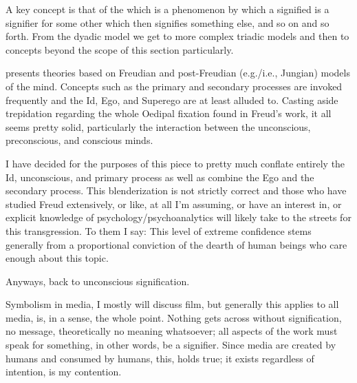 \documentclass[../butidigress.tex]{subfiles}
\begin{document}
A key concept is that of the  which is a phenomenon by which a signified is a signifier for some other  which then signifies something else, and so on and so forth.
From the dyadic model we get to more complex triadic models and then to concepts beyond the scope of this section particularly.


 presents theories based on Freudian and post-Freudian (e.g./i.e., Jungian) models of the mind.
Concepts such as the primary and secondary processes are invoked frequently and the Id, Ego, and Superego are at least alluded to.
Casting aside trepidation regarding the whole Oedipal fixation found in Freud's work, it all seems pretty solid, particularly the interaction between the unconscious, preconscious, and conscious minds.

I have decided for the purposes of this piece to pretty much conflate entirely the Id, unconscious, and primary process as well as combine the Ego and the secondary process.
This blenderization is not strictly correct and those who have studied Freud extensively, or like, at all I'm assuming, or have an interest in, or explicit knowledge of psychology/psychoanalytics will likely take to the streets for this transgression.
To them I say: 
This level of extreme confidence stems generally from a proportional conviction of the dearth of human beings who care enough about this topic.

Anyways, back to unconscious signification.

Symbolism in media, I mostly will discuss film, but generally this applies to all media, is, in a sense, the whole point.
Nothing gets across without signification, no message, theoretically no meaning whatsoever; all aspects of the work must speak for something, in other words, be a signifier.
Since media are created by humans and consumed by humans, this,  holds true; it exists regardless of intention, is my contention.
\end{document}
